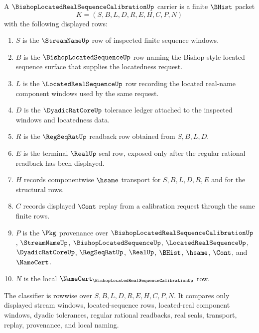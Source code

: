 \begin{definition}
\label{def:bishop-located-real-sequence-calibration-carrier}
A $\BishopLocatedRealSequenceCalibrationUp$ carrier is a finite $\BHist$ packet
$$
K=(S,B,L,D,R,E,H,C,P,N)
$$
with the following displayed rows:
\begin{enumerate}
\item $S$ is the $\StreamNameUp$ row of inspected finite sequence windows.
\item $B$ is the $\BishopLocatedSequenceUp$ row naming the Bishop-style located sequence surface that supplies the locatedness request.
\item $L$ is the $\LocatedRealSequenceUp$ row recording the located real-name component windows used by the same request.
\item $D$ is the $\DyadicRatCoreUp$ tolerance ledger attached to the inspected windows and locatedness data.
\item $R$ is the $\RegSeqRatUp$ readback row obtained from $S,B,L,D$.
\item $E$ is the terminal $\RealUp$ seal row, exposed only after the regular rational readback has been displayed.
\item $H$ records componentwise $\hsame$ transport for $S,B,L,D,R,E$ and for the structural rows.
\item $C$ records displayed $\Cont$ replay from a calibration request through the same finite rows.
\item $P$ is the $\Pkg$ provenance over $\BishopLocatedRealSequenceCalibrationUp$, $\StreamNameUp$, $\BishopLocatedSequenceUp$, $\LocatedRealSequenceUp$, $\DyadicRatCoreUp$, $\RegSeqRatUp$, $\RealUp$, $\BHist$, $\hsame$, $\Cont$, and $\NameCert$.
\item $N$ is the local $\NameCert_{\BishopLocatedRealSequenceCalibrationUp}$ row.
\end{enumerate}
The classifier is rowwise over $S,B,L,D,R,E,H,C,P,N$. It compares only displayed stream windows, located-sequence rows, located-real component windows, dyadic tolerances, regular rational readbacks, real seals, transport, replay, provenance, and local naming.
\end{definition}

